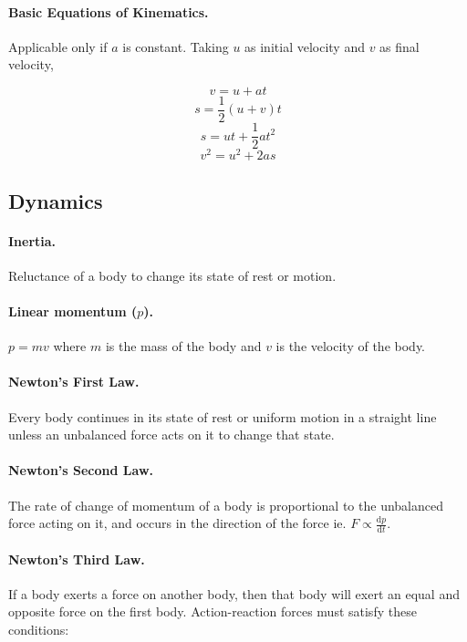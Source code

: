 \documentclass{article}
\begin{document}
\paragraph{Basic Equations of Kinematics.} Applicable only if $a$ is constant.
Taking $u$ as initial velocity and $v$ as final velocity,

\begin{equation} v = u + at \end{equation} \begin{equation} s = \frac{1}{2}(u +
  v)t \end{equation} \begin{equation} s = ut + \frac{1}{2}at^2 \end{equation}
    \begin{equation} v^2 = u^2 + 2as \end{equation}

\subsection{Dynamics}

\paragraph{Inertia.} Reluctance of a body to change its state of rest or motion.

\paragraph{Linear momentum ($p$).} $p = mv$ where $m$ is the mass of the body
and $v$ is the velocity of the body.

\paragraph{Newton's First Law.} Every body continues in its state of rest or
uniform motion in a straight line unless an unbalanced force acts on it to
change that state.

\paragraph{Newton's Second Law.} The rate of change of momentum of a body is
proportional to the unbalanced force acting on it, and occurs in the direction
of the force ie. $F \propto \frac{\mathrm{d}p}{\mathrm{d}t}$.

\paragraph{Newton's Third Law.} If a body exerts a force on another body, then
that body will exert an equal and opposite force on the first body.
Action-reaction forces must satisfy these conditions:
\end{document}
